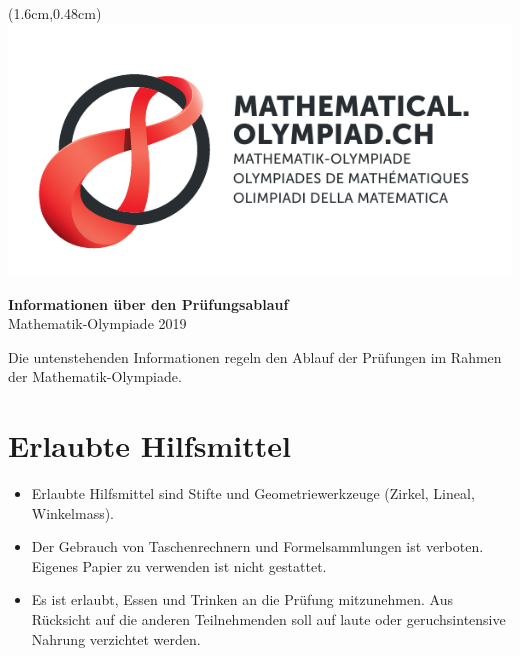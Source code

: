 \documentclass[12pt,a4paper]{article}
\begin{document}
\thispagestyle{empty}

\begin{textblock*}{\paperwidth}(1.6cm,0.48cm) %
\includegraphics[scale=0.67]{Logo_Mathematik_CMYK.pdf}
\end{textblock*}

\vspace*{1.5cm}

\begin{center}
\Huge{\textbf{Informationen über den Prüfungsablauf}}\\
\large{Mathematik-Olympiade 2019}
\end{center}

\bigskip

Die untenstehenden Informationen regeln den Ablauf der Prüfungen im Rahmen der Mathematik-Olympiade.

\section{Erlaubte Hilfsmittel}
\begin{itemize}
\item Erlaubte Hilfsmittel sind Stifte und Geometriewerkzeuge (Zirkel, Lineal, Winkelmass). 
\item Der Gebrauch von Taschenrechnern und Formelsammlungen ist verboten. Eigenes Papier zu verwenden ist nicht gestattet.
\item Es ist erlaubt, Essen und Trinken an die Prüfung mitzunehmen. Aus Rücksicht auf die anderen Teilnehmenden soll auf laute oder geruchsintensive Nahrung verzichtet werden.
\end{itemize}
\end{document}
